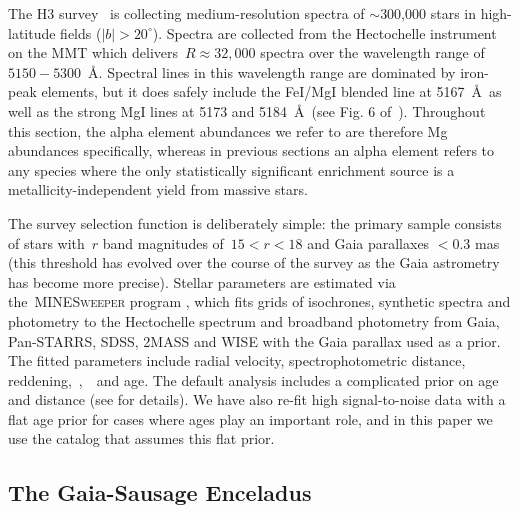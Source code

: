 \documentclass[ms.tex]{subfiles}
\begin{document}
The H3 survey~\citep{Conroy2019} is collecting medium-resolution spectra of
$\sim$300,000 stars in high-latitude fields ($\left|b\right| > 20^\circ$).
Spectra are collected from the Hectochelle instrument on the MMT
\citep{Szentgyorgyi2011} which delivers~$R \approx 32,000$ spectra over the
wavelength range of~$5150 - 5300$~\AA.
Spectral lines in this wavelength range are dominated by iron-peak elements,
but it does safely include the FeI/MgI blended line at 5167~\AA~as well as the
strong MgI lines at 5173 and 5184~\AA~(see Fig. 6 of~\citealp{Conroy2019}).
Throughout this section, the alpha element abundances we refer to are therefore
Mg abundances specifically, whereas in previous sections an alpha element
refers to any species where the only statistically significant enrichment
source is a metallicity-independent yield from massive stars.
\par
The survey selection function is deliberately simple: the primary sample
consists of stars with~$r$ band magnitudes of~$15 < r < 18$ and Gaia parallaxes
$< 0.3$ mas (this threshold has evolved over the course of the survey as the
Gaia astrometry has become more precise).
Stellar parameters are estimated via the~\textsc{MINESweeper} program
\citep{Cargile2020}, which fits grids of isochrones, synthetic spectra and
photometry to the Hectochelle spectrum and broadband photometry from Gaia,
Pan-STARRS, SDSS, 2MASS and WISE with the Gaia parallax used as a prior.
The fitted parameters include radial velocity, spectrophotometric distance,
reddening,~\feh,~\afe~and age.
The default analysis includes a complicated prior on age and distance (see
\citealt{Cargile2020} for details).
We have also re-fit high signal-to-noise data with a flat age prior for cases
where ages play an important role, and in this paper we use the catalog that
assumes this flat prior.

\subsection{The Gaia-Sausage Enceladus}
\label{sec:h3:gse}
\end{document}
